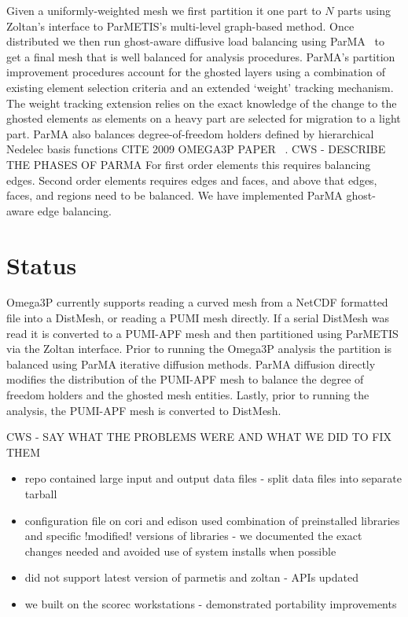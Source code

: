 \documentclass[a4paper]{article}
\begin{document}
Given a
uniformly-weighted mesh we first partition it one part to $N$ parts using
Zoltan's interface to ParMETIS's multi-level graph-based method.
Once distributed we then run ghost-aware diffusive load balancing using
ParMA~\cite{SmithParma2015} to get a final mesh that is well balanced for
analysis procedures.
ParMA's partition improvement procedures account for
the ghosted layers using a combination of existing element selection criteria
and an extended `weight' tracking mechanism.
The weight tracking extension relies on the exact knowledge of the change to the
ghosted elements as elements on a heavy part are selected for migration to a
light part.
ParMA also balances degree-of-freedom holders defined by 
hierarchical Nedelec basis functions CITE 2009 OMEGA3P PAPER ~\cite{ingelstrom2006new}.
CWS - DESCRIBE THE PHASES OF PARMA
For first order elements this requires balancing edges.
Second order elements requires edges and faces, and above that edges, faces, and
regions need to be balanced.
We have implemented ParMA ghost-aware edge balancing.

\section{Status}\label{sec:software}
Omega3P currently supports reading a curved mesh from a NetCDF formatted file
into a DistMesh, or reading a PUMI mesh directly.
If a serial DistMesh was read it is converted to a PUMI-APF mesh and then 
partitioned using ParMETIS via the Zoltan interface.
Prior to running the Omega3P analysis the partition is balanced using ParMA
iterative diffusion methods.
ParMA diffusion directly modifies the distribution of the PUMI-APF mesh to
balance the degree of freedom holders and the ghosted mesh entities.
Lastly, prior to running the analysis, the PUMI-APF mesh is converted to
DistMesh.

CWS - SAY WHAT THE PROBLEMS WERE AND WHAT WE DID TO FIX THEM
\begin{itemize}
  \item repo contained large input and output data files - split data files into separate tarball
  \item configuration file on cori and edison used combination of preinstalled
    libraries and specific !modified! versions of libraries - we documented the
    exact changes needed and avoided use of system installs when possible
  \item did not support latest version of parmetis and zoltan - APIs updated 
  \item we built on the scorec workstations - demonstrated portability improvements
\end{itemize}
\end{document}
